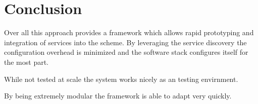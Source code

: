 \section{Conclusion}
Over all this approach provides a framework which allows rapid prototyping and integration of services into the scheme. By leveraging the service discovery the configuration
overhead is minimized and the software stack configures itself for the most part.

While not tested at scale the system works nicely as an testing envirnment.

By being extremely modular the framework is able to adapt very quickly.
